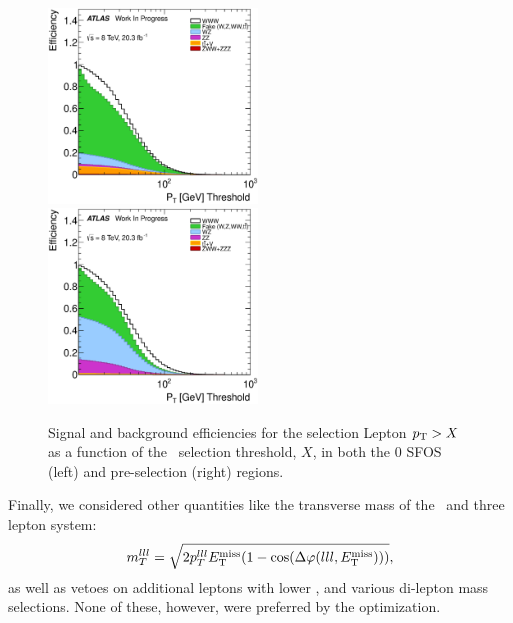 \begin{figure}[ht!]
\centering
\includegraphics[width=0.495\textwidth]{figures/optimization/SignalRegionsPreselection_0SFOS_Efficiencies/AllLeptonPt_Cumulative.eps}
\includegraphics[width=0.495\textwidth]{figures/optimization/SignalRegions_0p5mmZ0_Preselection_Efficiencies/AllLeptonPt_Cumulative.eps}
\caption{ Signal and background efficiencies 
for the selection
Lepton $p_{\mathrm{T}} > X$
as a function of the \pt~selection
threshold, $X$, in both the 0 SFOS (left) and pre-selection (right) regions.  }
\label{fig:pt_eff}
\end{figure}

Finally, we considered other quantities like the 
transverse mass of the \MET~and three lepton system:
\begin{equation}
m_{T}^{lll} = \sqrt{2p_{T}^{lll}E_{\mathrm{T}}^{\mathrm{miss}}(1-\cos(\Delta\varphi(lll,E_{\mathrm{T}}^{\mathrm{miss}})))},
\end{equation}
as well as vetoes on additional leptons with lower \pt, and various
di-lepton mass selections.  None of these, however, were preferred
by the optimization.

